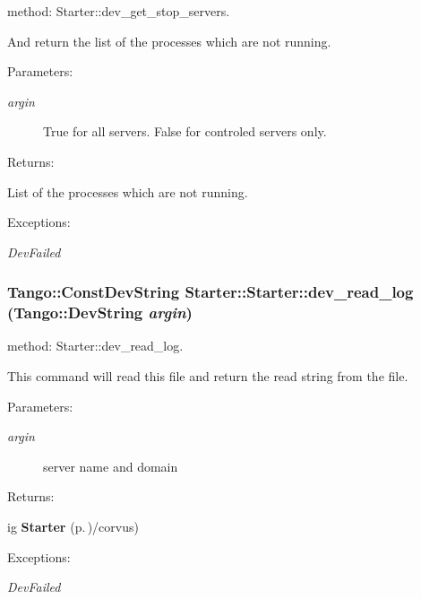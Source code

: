 method: Starter::dev\_\-get\_\-stop\_\-servers.

And return the list of the processes which are not running. \begin{Desc}
\item[Parameters: ]\par
\begin{description}
\item[{\em 
argin}]True for all servers. False for controled servers only. \end{description}
\end{Desc}
\begin{Desc}
\item[Returns: ]\par
List of the processes which are not running. \end{Desc}
\begin{Desc}
\item[Exceptions: ]\par
\begin{description}
\item[{\em 
Dev\-Failed}] \end{description}
\end{Desc}
\subsubsection{\setlength{\rightskip}{0pt plus 5cm}Tango::Const\-Dev\-String Starter::Starter::dev\_\-read\_\-log (Tango::Dev\-String {\em argin})}\label{classStarter_1_1Starter_z5_7}


method: Starter::dev\_\-read\_\-log.

This command will read this file and return the read string from the file. \begin{Desc}
\item[Parameters: ]\par
\begin{description}
\item[{\em 
argin}]server name and domain \end{description}
\end{Desc}
\begin{Desc}
\item[Returns: ]\par
ig {\bf Starter} {\rm (p.\,\pageref{classStarter_1_1Starter})}/corvus) \end{Desc}
\begin{Desc}
\item[Exceptions: ]\par
\begin{description}
\item[{\em 
Dev\-Failed}] \end{description}
\end{Desc}
